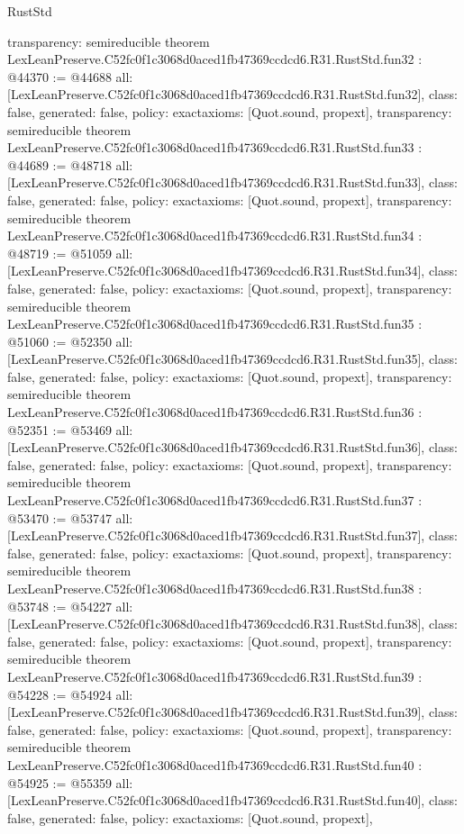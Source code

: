 \begin{lexlean}{RustStd}
\begin{coremodule}
{  transparency: semireducible
}
theorem LexLeanPreserve.C52fc0f1c3068d0aced1fb47369ccdcd6.R31.RustStd.fun32 : @44370 := @44688 {
  all: [LexLeanPreserve.C52fc0f1c3068d0aced1fb47369ccdcd6.R31.RustStd.fun32],
  class: false,
  generated: false,
  policy: exact{axioms: [Quot.sound, propext]},
  transparency: semireducible
}
theorem LexLeanPreserve.C52fc0f1c3068d0aced1fb47369ccdcd6.R31.RustStd.fun33 : @44689 := @48718 {
  all: [LexLeanPreserve.C52fc0f1c3068d0aced1fb47369ccdcd6.R31.RustStd.fun33],
  class: false,
  generated: false,
  policy: exact{axioms: [Quot.sound, propext]},
  transparency: semireducible
}
theorem LexLeanPreserve.C52fc0f1c3068d0aced1fb47369ccdcd6.R31.RustStd.fun34 : @48719 := @51059 {
  all: [LexLeanPreserve.C52fc0f1c3068d0aced1fb47369ccdcd6.R31.RustStd.fun34],
  class: false,
  generated: false,
  policy: exact{axioms: [Quot.sound, propext]},
  transparency: semireducible
}
theorem LexLeanPreserve.C52fc0f1c3068d0aced1fb47369ccdcd6.R31.RustStd.fun35 : @51060 := @52350 {
  all: [LexLeanPreserve.C52fc0f1c3068d0aced1fb47369ccdcd6.R31.RustStd.fun35],
  class: false,
  generated: false,
  policy: exact{axioms: [Quot.sound, propext]},
  transparency: semireducible
}
theorem LexLeanPreserve.C52fc0f1c3068d0aced1fb47369ccdcd6.R31.RustStd.fun36 : @52351 := @53469 {
  all: [LexLeanPreserve.C52fc0f1c3068d0aced1fb47369ccdcd6.R31.RustStd.fun36],
  class: false,
  generated: false,
  policy: exact{axioms: [Quot.sound, propext]},
  transparency: semireducible
}
theorem LexLeanPreserve.C52fc0f1c3068d0aced1fb47369ccdcd6.R31.RustStd.fun37 : @53470 := @53747 {
  all: [LexLeanPreserve.C52fc0f1c3068d0aced1fb47369ccdcd6.R31.RustStd.fun37],
  class: false,
  generated: false,
  policy: exact{axioms: [Quot.sound, propext]},
  transparency: semireducible
}
theorem LexLeanPreserve.C52fc0f1c3068d0aced1fb47369ccdcd6.R31.RustStd.fun38 : @53748 := @54227 {
  all: [LexLeanPreserve.C52fc0f1c3068d0aced1fb47369ccdcd6.R31.RustStd.fun38],
  class: false,
  generated: false,
  policy: exact{axioms: [Quot.sound, propext]},
  transparency: semireducible
}
theorem LexLeanPreserve.C52fc0f1c3068d0aced1fb47369ccdcd6.R31.RustStd.fun39 : @54228 := @54924 {
  all: [LexLeanPreserve.C52fc0f1c3068d0aced1fb47369ccdcd6.R31.RustStd.fun39],
  class: false,
  generated: false,
  policy: exact{axioms: [Quot.sound, propext]},
  transparency: semireducible
}
theorem LexLeanPreserve.C52fc0f1c3068d0aced1fb47369ccdcd6.R31.RustStd.fun40 : @54925 := @55359 {
  all: [LexLeanPreserve.C52fc0f1c3068d0aced1fb47369ccdcd6.R31.RustStd.fun40],
  class: false,
  generated: false,
  policy: exact{axioms: [Quot.sound, propext]},
}
\end{coremodule}
\end{lexlean}
